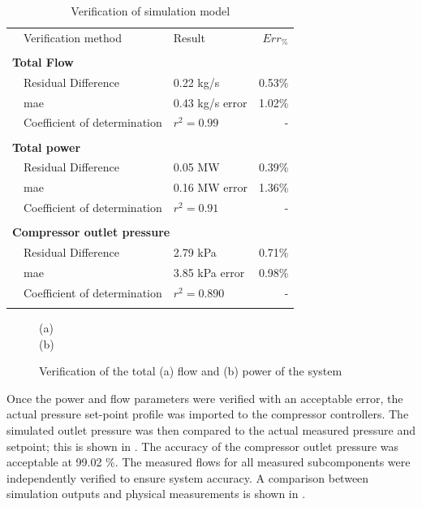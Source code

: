  \begin{table}[h!]
 	\label{Kus verification table}
 	\centering
 	\begin{tabular}{p{0.5cm}p{8cm}p{5cm}r}
 		\hline
 		&Verification method & Result & $Err_{\%}$\\
 		\hhline{====}
 		\\ \multicolumn{4}{l}{\textbf{ Total Flow}}\\
 		&Residual Difference  & 0.22 kg/s & 0.53\% \\
 		&\gls{mae} 					 & 0.43 kg/s error & 1.02\% \\
 		&Coefficient of determination & $r^2 =0.99$ & -\\ 
 		\\ \multicolumn{4}{l}{\textbf{ Total power}}\\
 		&Residual Difference  & 0.05 MW & 0.39\% \\
 		&\gls{mae} 					 & 0.16 MW error & 1.36\% \\
 		&Coefficient of determination & $r^2 =0.91$ & -\\ 
 		\\ \multicolumn{4}{l}{\textbf{ Compressor outlet pressure}}\\
 		&Residual Difference  & 2.79 kPa & 0.71\% \\
 		&\gls{mae} 					 & 3.85 kPa error & 0.98\% \\
 		&Coefficient of determination & $r^2 =0.890$ & -\\
 		\\ 	\hline
 	\end{tabular} 
 	\caption{Verification of simulation model}
 \end{table}

	\begin{figure}[h!]
		\centering
		
		(a)\\
		
		(b)\\
		\caption{Verification of the total (a) flow and (b) power of the system}
		\label{fig: Verification Power kusasalethu}
	\end{figure}

	Once the power and flow parameters were verified with an acceptable error, the actual pressure set-point profile was imported to the compressor controllers. The simulated outlet pressure was then compared to the actual measured pressure and setpoint; this is shown in . The accuracy of the compressor outlet pressure was acceptable at 99.02 \%. The measured flows for all measured subcomponents were independently verified to ensure system accuracy. A comparison between simulation outputs and physical measurements is shown in .

